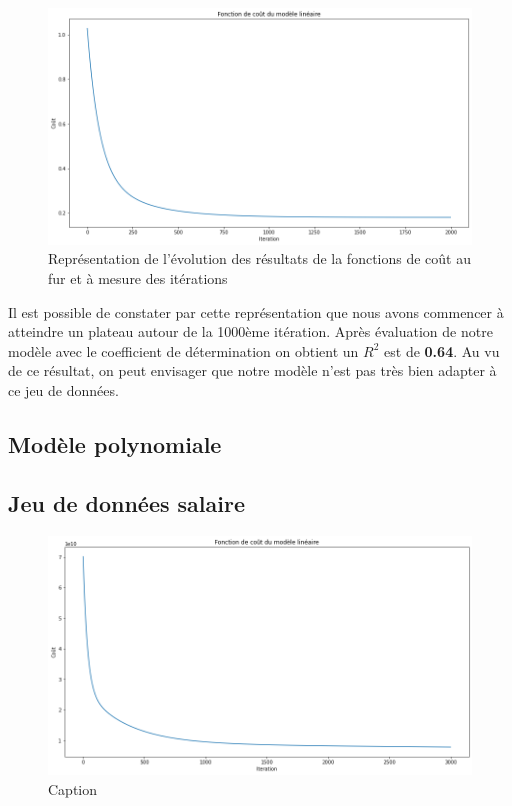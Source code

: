 \documentclass[french]{article}
\begin{document}
\begin{figure}[!htbp]
    \centering
    \includegraphics[width=\textwidth]{Rapport/images/cout_MLM.png}
    \caption{Représentation de l'évolution des résultats de la fonctions de coût au fur et à mesure des itérations}
    \label{fig:cout_MLM}
\end{figure}

\noindent Il est possible de constater par cette représentation que nous avons commencer à atteindre un plateau autour de la 1000ème itération. Après évaluation de notre modèle avec le coefficient de détermination on obtient un $R^{2}$ est de \textbf{0.64}. Au vu de ce résultat, on peut envisager que notre modèle n'est pas très bien adapter à ce jeu de données.

\subsection{Modèle polynomiale}

\subsection{Jeu de données salaire}

\begin{figure}[!htbp]
    \centering
    \includegraphics[width=\textwidth]{Rapport/images/cout_MLP.png}
    \caption{Caption}
    \label{fig:my_label}
\end{figure}
\end{document}
